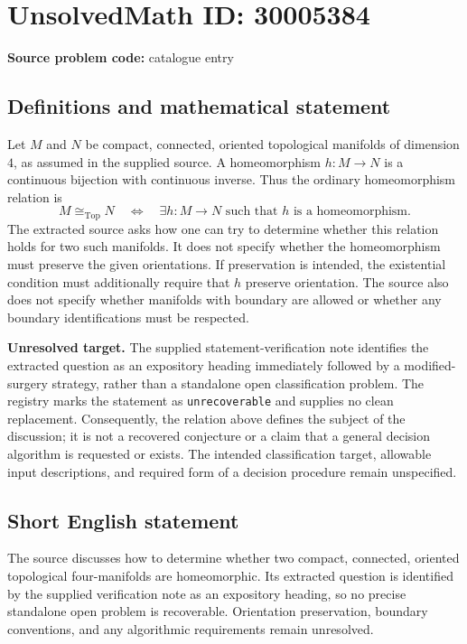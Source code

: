 \documentclass[11pt]{article}
\begin{document}
\section*{UnsolvedMath ID: 30005384}
\textbf{Source problem code:} catalogue entry
\subsection{Definitions and mathematical statement}
Let \(M\) and \(N\) be compact, connected, oriented topological manifolds of dimension \(4\), as assumed in the supplied source. A homeomorphism \(h\colon M\to N\) is a continuous bijection with continuous inverse. Thus the ordinary homeomorphism relation is
\[
M\cong_{\mathrm{Top}}N
\quad\Longleftrightarrow\quad
\exists h\colon M\to N\text{ such that }h\text{ is a homeomorphism}.
\]
The extracted source asks how one can try to determine whether this relation holds for two such manifolds. It does not specify whether the homeomorphism must preserve the given orientations. If preservation is intended, the existential condition must additionally require that \(h\) preserve orientation. The source also does not specify whether manifolds with boundary are allowed or whether any boundary identifications must be respected.

\textbf{Unresolved target.} The supplied statement-verification note identifies the extracted question as an expository heading immediately followed by a modified-surgery strategy, rather than a standalone open classification problem. The registry marks the statement as \texttt{unrecoverable} and supplies no clean replacement. Consequently, the relation above defines the subject of the discussion; it is not a recovered conjecture or a claim that a general decision algorithm is requested or exists. The intended classification target, allowable input descriptions, and required form of a decision procedure remain unspecified.
\subsection{Short English statement}
The source discusses how to determine whether two compact, connected, oriented topological four-manifolds are homeomorphic. Its extracted question is identified by the supplied verification note as an expository heading, so no precise standalone open problem is recoverable. Orientation preservation, boundary conventions, and any algorithmic requirements remain unresolved.
\end{document}
